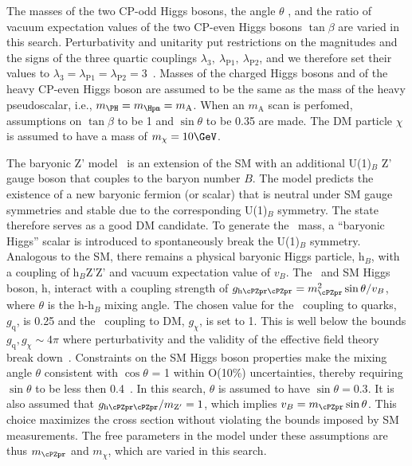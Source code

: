 The masses of the two CP-odd Higgs bosons, the angle $\theta$ , and the ratio of vacuum
expectation values of the two CP-even Higgs bosons $\tan\beta$ are varied in this search. 
Perturbativity and unitarity put restrictions on the magnitudes and the
signs of the three quartic couplings
$\lambda_3,~\lambda_{\mathrm{P}1},~\lambda_{\mathrm{P}2}$,
and we therefore set their values to $\lambda_3=\lambda_{\mathrm{P}1}=\lambda_{\mathrm{P}2}=3$~\cite{Bauer2017}. Masses of the charged Higgs bosons and of the heavy CP-even Higgs boson are assumed to be the same as the mass of the heavy pseudoscalar, i.e., $m_{\PH}=m_{\Hpm}=m_{\mathrm{A}}$. When an $m_{\mathrm{A}}$ scan is perfomed, assumptions on $\tan\beta$ to be 1 and $\sin\theta$ to be 0.35 are made. The DM particle $\chi$ is assumed to have a mass of $m_\chi=10\GeV$.


The baryonic Z' model~\cite{PhysRevD.89.075017} is an extension of the SM with an additional U(1)$_{B}$ Z' gauge 
boson that couples to the baryon number $B$. The model predicts the existence of a new baryonic fermion (or scalar) that is neutral under SM gauge symmetries and stable due to the corresponding U(1)$_{B}$ symmetry. The state therefore serves as a good DM candidate.
To generate the  \cPZpr\ mass, a ``baryonic Higgs'' scalar is introduced to 
spontaneously break the U(1)$_B$ symmetry. Analogous to the SM, there remains 
a physical baryonic Higgs particle, h$_{B}$, with a coupling of h$_{B}$Z'Z' 
and vacuum expectation value of $v_{B}$. 
The \cPZpr\ and SM Higgs boson, h, interact with a coupling strength of 
$g_{\text{h}\cPZpr\cPZpr} = m_{\cPZpr}^{2} \sin \theta/v_{B}$, where $\theta$ is the h-h$_{B}$ 
mixing angle. The chosen value for the \cPZpr\ coupling to quarks,
$g_\text{q}$, is 0.25 and the \cPZpr\ coupling to DM, $g_\chi$, is set to 1. This is well below the bounds $g_\text{q},g_\chi\sim4\pi$ where perturbativity and the validity of the effective field theory break down~\cite{PhysRevD.89.075017}. Constraints on the SM Higgs boson properties make the mixing angle $\theta$ consistent with $\cos\theta$ = 1 within O(10\%) uncertainties, thereby requiring  $\sin\theta$ to be less then 0.4~\cite{PhysRevD.89.075017}. In this search, $\theta$ is assumed to have $\sin\theta= 0.3$. It is also assumed that $g_{\text{h}\cPZpr\cPZpr}/m_{\mathrm{Z}'}=1$, which implies $v_B=m_{\cPZpr}\sin\theta$. This choice maximizes the cross section without violating the bounds imposed by SM measurements. The free parameters in the model under these assumptions are thus $m_{\cPZpr}$ and $m_\chi$, which are varied in this search.

